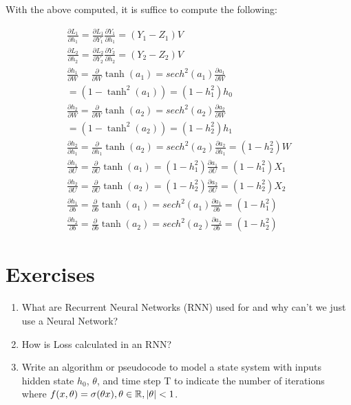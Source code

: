 \begin{example}
With the above computed, it is suffice to compute the following:

\begin{align*}
\frac{\partial L_1}{\partial h_1}=\frac{\partial L_1}{\partial Y_1}\frac{\partial Y_1}{\partial h_1}=(Y_1-Z_1)V\\[1em]
\frac{\partial L_2}{\partial h_2}=\frac{\partial L_2}{\partial Y_2}\frac{\partial Y_2}{\partial h_2}=(Y_2-Z_2)V\\[1em]
\frac{\partial h_1}{\partial W}=\frac{\partial }{\partial W} \tanh (a_1)=sech^2(a_1)\frac{\partial a_1}{\partial W}\\
=(1-\tanh ^2(a_1))=(1-h_1^2)h_0\\[1em]
\frac{\partial h_2}{\partial W}=\frac{\partial }{\partial W} \tanh (a_2)=sech^2(a_2)\frac{\partial a_2}{\partial W}\\
=(1-\tanh ^2(a_2))=(1-h_2^2)h_1\\[1em]
\frac{\partial h_2}{\partial h_1}=\frac{\partial }{\partial h_1} \tanh (a_2)=sech^2(a_2)\frac{\partial a_2}{\partial h_1}=(1-h_2^2)W\\[1em]
\frac{\partial h_1}{\partial U}=\frac{\partial }{\partial U} \tanh (a_1)=(1-h_1^2)\frac{\partial a_1}{\partial U}=(1-h_1^2)X_1\\[1em]
\frac{\partial h_2}{\partial U}=\frac{\partial }{\partial U} \tanh (a_2)=(1-h_2^2)\frac{\partial a_2}{\partial U}=(1-h_2^2)X_2\\[1em]
\frac{\partial h_1}{\partial b}=\frac{\partial }{\partial b}\tanh (a_1)=sech^2(a_1)\frac{\partial a_1}{\partial b}=(1-h_1^2)\\[1em]
\frac{\partial h_2}{\partial b}=\frac{\partial }{\partial b}\tanh (a_2)=sech^2(a_2)\frac{\partial a_2}{\partial b}=(1-h_2^2)
\end{align*}
\end{example}

\section{Exercises}
\begin{enumerate}
    \item What are Recurrent Neural Networks (RNN) used for and why can't we just use a Neural Network?
            
    \item How is Loss calculated in an RNN?
    
    \item Write an algorithm or pseudocode to model a state system with inputs hidden state $h_0$, $\theta$, and time step T to indicate the number of iterations where $f(x,\theta) = \sigma(\theta x), \theta \in \R,  |\theta| < 1$.\\
    
      
\end{enumerate}



